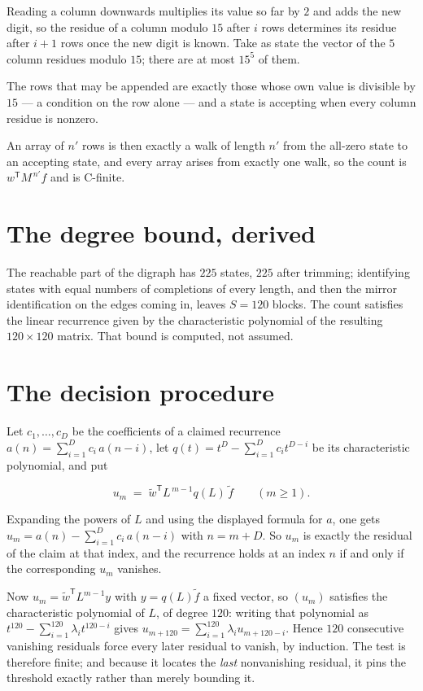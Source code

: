 \documentclass[11pt]{article}
\theoremstyle{definition}
\begin{document}
Reading a column downwards multiplies its value so far by $2$ and adds the new digit, so the residue of a column modulo $15$ after $i$ rows determines its residue after $i+1$ rows once the new digit is known. Take as state the vector of the $5$ column residues modulo $15$; there are at most $15^{5}$ of them.

The rows that may be appended are exactly those whose own value is divisible by $15$ --- a condition on the row alone --- and a state is accepting when every column residue is nonzero.

An array of $n'$ rows is then exactly a walk of length $n'$ from the all-zero state to an accepting state, and every array arises from exactly one walk, so the count is $w^{\mathsf T}M^{\,n'}f$ and is C-finite.

\section{The degree bound, derived}

The reachable part of the digraph has $225$ states, $225$ after trimming; identifying states with equal numbers of completions of every length, and then the mirror identification on the edges coming in, leaves $S = 120$ blocks. The count satisfies the linear recurrence given by the characteristic polynomial of the resulting $120\times120$ matrix. That bound is computed, not assumed.

\section{The decision procedure}

Let $c_1,\dots,c_D$ be the coefficients of a claimed recurrence $a(n) = \sum_{i=1}^{D} c_i\,a(n-i)$, let $q(t) = t^{D} - \sum_{i=1}^{D} c_i t^{D-i}$ be its characteristic polynomial, and put

\[u_m \;=\; \tilde w^{\mathsf T} L^{\,m-1} q(L)\,\tilde f \qquad (m \ge 1).\]

Expanding the powers of $L$ and using the displayed formula for $a$, one gets $u_m = a(n) - \sum_{i=1}^{D} c_i\,a(n-i)$ with $n = m + D$. So $u_m$ is exactly the residual of the claim at that index, and the recurrence holds at an index $n$ if and only if the corresponding $u_m$ vanishes.

Now $u_m = \tilde w^{\mathsf T} L^{m-1} y$ with $y = q(L)\tilde f$ a fixed vector, so $(u_m)$ satisfies the characteristic polynomial of $L$, of degree $120$: writing that polynomial as $t^{120} - \sum_{i=1}^{120} \lambda_i t^{120-i}$ gives $u_{m+120} = \sum_{i=1}^{120} \lambda_i u_{m+120-i}$. Hence $120$ consecutive vanishing residuals force every later residual to vanish, by induction. The test is therefore finite; and because it locates the {\itshape last} nonvanishing residual, it pins the threshold exactly rather than merely bounding it.
\end{document}
